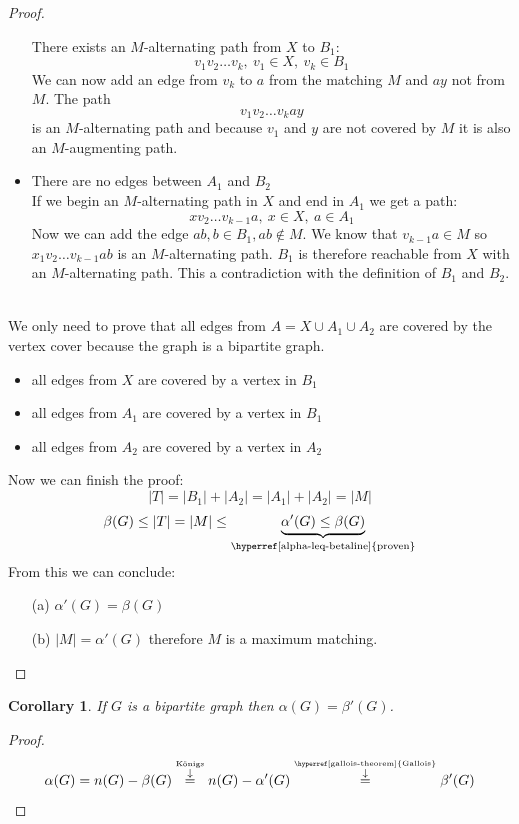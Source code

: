 \documentclass[notitlepage, 12pt]{article}
\newtheorem*{corollary}{Corollary}
\begin{document}
\begin{proof}
\begin{itemize}
    There exists an $M$-alternating path from $X$ to $B_1$:
    \[v_1v_2\dots v_k,\ v_1 \in X,\ v_k \in B_1\]
    We can now add an edge from $v_k$ to $a$ from the matching $M$ and $ay$ not from $M$.
    The path
    \[v_1v_2\dots v_kay\]
    is an $M$-alternating path and because $v_1$ and $y$ are not covered by $M$ it is also an $M$-augmenting path.
    \item There are no edges between $A_1$ and $B_2$ \\
    If we begin an $M$-alternating path in $X$ and end in $A_1$ we get a path:
    \[xv_2\dots v_{k-1}a,\ x \in X,\ a \in A_1\]
    Now we can add the edge $ab, b\in B_1, ab \notin M$. We know that $v_{k-1}a \in M$ so
    $x_1v_2\dots v_{k-1}ab$ is an $M$-alternating path. $B_1$ is therefore reachable from $X$ with
    an $M$-alternating path. This a contradiction with the definition
    of $B_1$ and $B_2$.
  \end{itemize}

  \noindent{}\\
  We only need to prove that all edges from $A = X\cup A_1\cup A_2$ are covered by the vertex cover because the graph
  is a bipartite graph.
  \begin{itemize}
    \item all edges from $X$ are covered by a vertex in $B_1$
    \item all edges from $A_1$ are covered by a vertex in $B_1$
    \item all edges from $A_2$ are covered by a vertex in $A_2$
  \end{itemize}

  Now we can finish the proof:
  \[|T| = |B_1|+|A_2| = |A_1|+|A_2|=|M|\]
  \[\beta(G) \leq |T| = |M| \leq \underbrace{\alpha'(G) \leq \beta(G)}_{\text{\hyperref[alpha-leq-betaline]{proven}}}\]
  From this we can conclude:
  \begin{itemize}
    \item[(a)] $\alpha'(G) = \beta(G)$
    \item[(b)] $|M| = \alpha'(G)$ therefore $M$ is a maximum matching.
  \end{itemize}
\end{proof}
\begin{corollary}
  If $G$ is a bipartite graph then $\alpha(G) = \beta'(G)$.
\end{corollary}
\begin{proof}
  \[\alpha(G) = n(G) - \beta(G) \stackrel{ \stackrel{\text{Königs}}{\downarrow} }{=} n(G) - \alpha'(G) \stackrel{ \stackrel{\text{\hyperref[gallois-theorem]{Gallois}}}{\downarrow} }{=} \beta'(G)\]
\end{proof}
\end{document}
